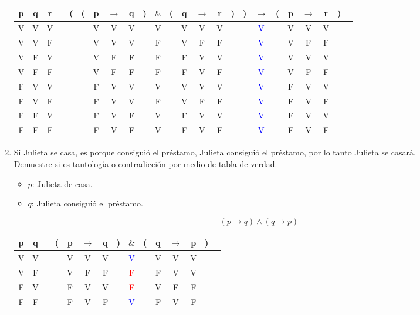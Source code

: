 \documentclass[a4paper,10pt]{article}
\begin{document}
\begin{enumerate}
\begin{tabular}{@{ }c@{ }@{ }c@{ }@{ }c | c@{ }@{}c@{}@{}c@{}@{ }c@{ }@{ }c@{ }@{ }c@{ }@{}c@{}@{ }c@{ }@{}c@{}@{ }c@{ }@{ }c@{ }@{ }c@{ }@{}c@{}@{}c@{}@{ }c@{ }@{}c@{}@{ }c@{ }@{ }c@{ }@{ }c@{ }@{}c@{}@{ }c}
p & q & r &  & ( & ( & p & $\rightarrow$ & q & ) & $\&$ & ( & q & $\rightarrow$ & r & ) & ) & $\rightarrow$ & ( & p & $\rightarrow$ & r & ) & \\
\hline 
V & V & V &  &  &  & V & V & V &  & V &  & V & V & V &  &  & \textcolor{blue}{V} &  & V & V & V &  & \\
V & V & F &  &  &  & V & V & V &  & F &  & V & F & F &  &  & \textcolor{blue}{V} &  & V & F & F &  & \\
V & F & V &  &  &  & V & F & F &  & F &  & F & V & V &  &  & \textcolor{blue}{V} &  & V & V & V &  & \\
V & F & F &  &  &  & V & F & F &  & F &  & F & V & F &  &  & \textcolor{blue}{V} &  & V & F & F &  & \\
F & V & V &  &  &  & F & V & V &  & V &  & V & V & V &  &  & \textcolor{blue}{V} &  & F & V & V &  & \\
F & V & F &  &  &  & F & V & V &  & F &  & V & F & F &  &  & \textcolor{blue}{V} &  & F & V & F &  & \\
F & F & V &  &  &  & F & V & F &  & V &  & F & V & V &  &  & \textcolor{blue}{V} &  & F & V & V &  & \\
F & F & F &  &  &  & F & V & F &  & V &  & F & V & F &  &  & \textcolor{blue}{V} &  & F & V & F &  & \\
\end{tabular}

\item Si Julieta se casa, es porque consiguió el préstamo, Julieta consiguió el préstamo, por lo tanto Julieta se casará.\\
Demuestre si es tautología o contradicción por medio de tabla de verdad.
\begin{itemize}
 \item \(p\): Julieta de casa.
 \item \(q\): Julieta consiguió el préstamo.
\end{itemize}

\[(p \to q) \land (q \to p)\]

\begin{tabular}{@{ }c@{ }@{ }c | c@{ }@{}c@{}@{ }c@{ }@{ }c@{ }@{ }c@{ }@{}c@{}@{ }c@{ }@{}c@{}@{ }c@{ }@{ }c@{ }@{ }c@{ }@{}c@{}@{ }c}
p & q &  & ( & p & $\rightarrow$ & q & ) & $\&$ & ( & q & $\rightarrow$ & p & ) & \\
\hline 
V & V &  &  & V & V & V &  & \textcolor{blue}{V} &  & V & V & V &  & \\
V & F &  &  & V & F & F &  & \textcolor{red}{F} &  & F & V & V &  & \\
F & V &  &  & F & V & V &  & \textcolor{red}{F} &  & V & F & F &  & \\
F & F &  &  & F & V & F &  & \textcolor{blue}{V} &  & F & V & F &  & \\
\end{tabular}

\end{enumerate}
\end{document}
